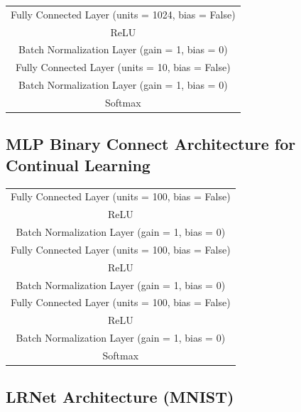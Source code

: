 \begin{table}[h!]
\begin{center}
\begin{tabular}{ c }
   Fully Connected Layer (units = 1024, bias = False) \\      
   ReLU \\      
   Batch Normalization Layer (gain = 1, bias = 0) \\ \hline
   Fully Connected Layer (units = 10, bias = False)  \\      
   Batch Normalization Layer (gain = 1, bias = 0) \\
   Softmax \\ \hline
\end{tabular}
\end{center}
\end{table}

\subsection*{MLP Binary Connect Architecture for Continual Learning}

\begin{table}[H]
\begin{center}
\begin{tabular}{  c  }
\hline
   Fully Connected Layer (units = 100, bias = False) \\
   ReLU  \\
   Batch Normalization Layer (gain = 1, bias = 0) \\ \hline
   Fully Connected Layer (units = 100, bias = False)  \\
   ReLU  \\
   Batch Normalization Layer (gain = 1, bias = 0) \\ \hline
   Fully Connected Layer (units = 100, bias = False)   \\
   ReLU \\
   Batch Normalization Layer (gain = 1, bias = 0)  \\ 
   Softmax \\\hline
\end{tabular}
\end{center}
\end{table}


\subsection*{LRNet Architecture (MNIST)}

